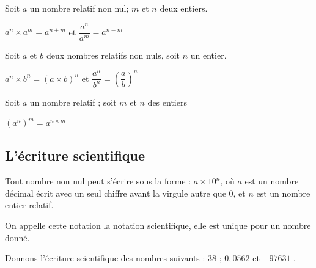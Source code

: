 \documentclass[a4paper,10pt]{report}
\begin{document}
\begin{prop}
Soit $a$ un nombre relatif non nul; $m$ et $n$ deux entiers.
\begin{center}
$a^n \times a^m = a^{n+m}$ \hspace{0.5cm} et \hspace{0.5cm} $\dfrac{a^n}{a^m} = a^{n-m}$
\end{center}
\end{prop}

\begin{ex}
 
\medskip\noindent\grandscarreaux{\linewidth}{2.4cm}
\end{ex}

\begin{prop}
Soit $a$ et $b$ deux nombres relatifs non nuls, soit $n$ un entier.
\begin{center}
$a^n \times b^n = (a\times b)^{n}$ \hspace{0.5cm} et \hspace{0.5cm} $\dfrac{a^n}{b^n} = \left( \dfrac{a}{b} \right)^{n}$
\end{center}
\end{prop}

\begin{prop}
Soit $a$ un nombre relatif ; soit $m$ et $n$ des entiers
\begin{center}
$\left( a^n \right)^{m} = a^{n \times m}$
\end{center}
\end{prop}

\begin{ex}
 
\medskip\noindent\grandscarreaux{\linewidth}{3cm}
\end{ex}

\subsection{L'écriture scientifique}

\begin{prop}
Tout nombre non nul peut s'écrire sous la forme : $a \times 10^n$, où $a$ est un nombre décimal écrit avec un seul chiffre avant la virgule autre que $0$, et $n$ est un nombre entier relatif. 

\noindent On appelle cette notation la notation scientifique, elle est unique pour un nombre donné.
\end{prop}

\begin{ex}
Donnons l'écriture scientifique des nombres suivants : \quad $38$ \quad ; \quad $0,0562$ \quad et \quad $-97631$ .

\medskip\noindent\grandscarreaux{\linewidth}{3cm}
\end{ex}
\end{document}
